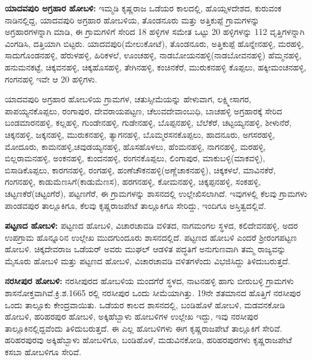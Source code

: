 \textbf{ಯಾದವಪುರಿ ಅಗ್ರಹಾರ ಹೋಬಳಿ:} ಇಮ್ಮಡಿ ಕೃಷ್ಣರಾಜ ಒಡೆಯರ ಕಾಲದಲ್ಲಿ, ಹೊಯ್ಸಳದೇಶದ, ಕುರುವಂಕ ನಾಡಿನಲ್ಲಿದ್ದ, ಯಾದವಪುರಿ ಅಗ್ರಹಾರ ಹೋಬಳಿಯ, ತೊಂಡನೂರು ಮತ್ತು ಅತ್ತಿಕುಪ್ಪೆ ಗ್ರಾಮಗಳನ್ನು ಅಗ್ರಹಾರಗಳನ್ನಾಗಿ ಮಾಡಿ, ಈ ಗ್ರಾಮಗಳಿಗೆ ಸೇರಿದ 18 ಹಳ್ಳಿಗಳ ಸಮೇತ ಒಟ್ಟು 20 ಹಳ್ಳಿಗಳನ್ನು 112 ವೃತ್ತಿಗಳನ್ನಾಗಿ ವಿಂಗಡಿಸಿ, ದತ್ತಿಯಾಗಿ ಬಿಟ್ಟರು. ಯಾದವಪುರಿ(ಮೇಲುಕೋಟೆ), ತೊಂಡನೂರು, ಅತ್ತಿಕುಪ್ಪೆ ಹೊನ್ನೇನಹಳ್ಳಿ, ಮರಹಳ್ಳಿ, ಸಾದುಗೊಂಡನಹಳ್ಳಿ, ಹೆರುಳಹಳ್ಳಿ, ಹಿರಿಕಳಲೆ, ಊಂಚಹಳ್ಳಿ, ನಾಡಬೋಯನಹಳ್ಳಿ(ನಾಡಬೋವನಹಳ್ಳಿ) ಹೆಮ್ಮನಹಳ್ಳಿ, ಹನುಮನಕಟ್ಟೆ, ಚಿಕ್ಕವನಹಳ್ಳಿ, ಚಿಕ್ಕಹೊಸಹಳ್ಳಿ, ತೇಗಿನಹಳ್ಳಿ, ಕಂಚಿನಕೆರೆ, ಮುರುಕನಹಳ್ಳಿ ಕೊಪ್ಪಲು, ಹಕ್ಕೀಮಂಚನಹಳ್ಳಿ, ಗಂಗನಹಳ್ಳಿ ಇವೇ ಆ 20 ಹಳ್ಳಿಗಳು.

ಯಾದವಪುರಿ ಅಗ್ರಹಾರ ಹೋಬಳಿಯ ಗ್ರಾಮಗಳ, ಚತುಸ್ಸೀಮೆಯನ್ನು ಹೇಳುವಾಗ, ಲಕ್ಷ್ಮೀಸಾಗರ, ಪಾಪಯ್ಯನ\-ಕೊಪ್ಪಲು, ರಂಗಾಪುರ, ದೇವರಾಯಪಟ್ಟಣ, ಚೆಲುವದೇವಾಂಬುಧಿ, ಬಾಚಹಳ್ಳಿ ಅಗ್ರಹಾರಕ್ಕೆ ಸೇರಿದ ಬಂಡಮಾರನಹಳ್ಳಿ, ಕಲ್ಲಹಳ್ಳಿ, ಗುಂಡೇನಹಳ್ಳಿ, ಗುಡೇನಹಳ್ಳಿ, ಬೊಪ್ಪನಹಳ್ಳಿ, ಬೆಲೆಕೆರೆ, ಚಟ್ಟಯ್ಯನಹಳ್ಳಿ, ಶೀಳುನೆರೆ, ಚಿಕ್ಕನಹಳ್ಳಿ, ಜಕ್ಕನಹಳ್ಳಿ, ಮುರುಕನಹಳ್ಳಿ, ತ್ಯಾಗನಹಳ್ಳಿ, ಬೊಮ್ಮರಸನಕೊಪ್ಪಲು, ಹಾದನೂರು, ಅಗಸರಹಳ್ಳಿ, ಮೋದೂರು, ಕಾಮನಹಳ್ಳಿ,\break ಚವುಡಯ್ಯನಹಳ್ಳಿ, ಹೊಸಹೊಳಲು, ಹೆಂಮನಹಳ್ಳಿ, ನಾಗನಹಳ್ಳಿ, ಮರಹಳ್ಳಿ, ಬಿಲ್ಲರಾಮನಹಳ್ಳಿ, ಅಂಕನಹಳ್ಳಿ, ಕುಂದನಹಳ್ಳಿ, ರಂಗನಕೊಪ್ಪಲು, ಲಿಂಗಾಪುರ, ಮಾಕುಬಳ್ಳಿ(ಮಾಕವಳ್ಳಿ), ಬಿಸಾಡಿಕೊಪ್ಪಲು, ಕಾರಗನಹಳ್ಳಿ, ರಂಗಹಳ್ಳಿ, ಹಂಣೆಚೌಕನ\-ಹಳ್ಳಿ\break (ಅಣ್ಣೆಚಾಕನಹಳ್ಳಿ), ಚಿಕ್ಕಕಳಲೆ, ಮಾವಿನಕೆರೆ, ಗಂಗನಹಳ್ಳಿ, ಕಾಡುಮೆಣಸಿಗೆ(ಕಾಡುಮೆಣಸ), ಹರಗನಹಳ್ಳಿ, ಕೋಮನಹಳ್ಳಿ, ಚಿಕ್ಕಪ್ಪನಹಳ್ಳಿ, ಸಂಕಹಳ್ಳಿ, ಚಟ್ಟಣಕೆರೆ(ಚಟ್ಟಂಗೆರೆ), ಪಟ್ಟಣಗೆರೆ, ಈ ಗ್ರಾಮಗಳನ್ನು ಶಾಸನದಲ್ಲಿ ಉಲ್ಲೇಖಿಸಲಾಗಿದೆ. ಇವುಗಳಲ್ಲಿ ಕೆಲವು ಗ್ರಾಮಗಳು ಪಾಂಡವಪುರ ತಾಲ್ಲೂಕಿಗೂ, ಕೆಲವು ಕೃಷ್ಣರಾಜಪೇಟೆ ತಾಲ್ಲೂಕಿಗೂ ಸೇರಿದ್ದು, ಇಂದಿಗೂ ಅಸ್ತಿತ್ವದಲ್ಲಿವೆ.

\textbf{ಪಟ್ಟಣದ ಹೋಬಳಿ:} ಪಟ್ಟಣದ ಹೋಬಳಿ, ವಿಚಾರಚಾವಡಿ ವಳಿತದ, ನಾಗಮಂಗಲ ಸ್ಥಳದ, ಕಲಿದೇವನಹಳ್ಳಿ, ಅದರ ಉಪಗ್ರಾಮ ಹೊನ್ನೂರಿನ ಉಲ್ಲೇಖ ಮುದಗುಂದೂರು ಶಾಸನದಲ್ಲಿದೆ. ಪಟ್ಟಣದ ಹೋಬಳಿ ಎಂದರೆ ಶ‍್ರೀರಂಗಪಟ್ಟಣ ಹೋಬಳಿ. ಚಿಕ್ಕದೇವರಾಜ ಒಡೆಯರ್​ ಅವರು ಮುಘಲ್​ ಆಡಳಿತ ಪದ್ಧತಿಗೆ ಅನುಗುಣವಾಗಿ ತಮ್ಮ ರಾಜ್ಯವನ್ನು ಮೈಸೂರು ಹೋಬಳಿ ಮತ್ತು ಪಟ್ಟಣದ ಹೋಬಳಿ, ವಿಚಾರಚಾವಡಿ ವಳಿತಗಳೆಂದು ವಿಭಜಿಸಿದ್ದು ತಿಳಿದುಬರುತ್ತದೆ.

\textbf{ನರಸೀಪುರ ಹೋಬಳಿ:} ನರಸೀಪುರದ ಹೋಬಳಿಯ ಮಂದಗೆರೆ ಸ್ಥಳದ, ನಾಟನಹಳ್ಳಿ ಹಾಗು ಬೀರುಬಳ್ಳಿ ಗ್ರಾಮಗಳು ಶಾಸನೋಕ್ತವಾಗಿವೆ.ಕ್ರಿ.ಶ.1665 ರಲ್ಲಿ ನರಸೀಪುರ ಒಂದು ಸೀಮೆಯಾಗಿತ್ತು. 19ನೇ ಶತಮಾನದ ಹೊತ್ತಿಗೆ ನರಸೀಪುರ ಒಂದು ತಾಲ್ಲೂಕು ಕೇಂದ್ರವಾಯಿತು. ಒಡೆಯರ ಕಾಲದ ಶಾಸನದಲ್ಲಿ, ಬಂಡಿಹೊಳೆ ಹೋಬಳಿ, ಮಡವನಕೋಡಿ ಹೋಬಳಿ, ಹರಿಹರಪುರ ಹೋಬಳಿ, ಅಕ್ಕಿಹೆಬ್ಬಾಳು ಹೋಬಳಿಗಳ ಉಲ್ಲೇಖ ಇದ್ದು, ಇವು ನರಸೀಪುರ ತಾಲ್ಲೂಕಿನಲ್ಲಿದ್ದವೆಂದು ತಿಳಿದುಬರುತ್ತದೆ. ಈ ಎಲ್ಲ ಹೋಬಳಿಗಳು ಈಗ ಕೃಷ್ಣರಾಜಪೇಟೆ ತಾಲ್ಲೂಕಿಗೆ ಸೇರಿವೆ. ಹರಿಹರಪುರವು ಅಕ್ಕಿಹೆಬ್ಬಾಳು ಹೋಬಳಿಗೂ, ಬಂಡಿಹೊಳೆ, ಮಡುವಿನಕೋಡಿ, ಹರಿಹರಪುರಗಳು ಕೃಷ್ಣರಾಜಪೇಟೆ ಕಸಬಾ ಹೋಬಳಿಗೂ ಸೇರಿವೆ.


